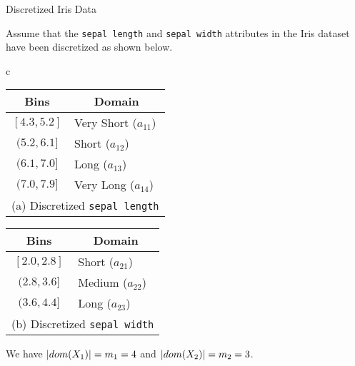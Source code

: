 \begin{frame}{Discretized Iris Data}

 Assume that the \texttt{sepal length} and \texttt{sepal
    width} attributes in the Iris dataset have been discretized
    as shown below.

    \medskip


  {\begin{tabular}{c}
{
{
    \label{tab:class:prob:slbin}
\renewcommand{\arraystretch}{1.1} 
\begin{tabular}{|c|l|}
\hline
Bins & \multicolumn{1}{c|}{Domain} \\ \hline
$[4.3, 5.2]$ & Very Short ($a_{11}$) \\
$(5.2, 6.1]$ & Short ($a_{12}$) \\
$(6.1, 7.0]$ & Long ($a_{13}$)\\
$(7.0, 7.9]$ & Very Long ($a_{14}$)\\ \hline
\multicolumn{2}{c}{\fontsize{8}{8}\selectfont(a) Discretized {\tt sepal length}}\\
\end{tabular}
}
{
\label{tab:class:prob:swbin}
\renewcommand{\arraystretch}{1.1}  
\begin{tabular}{|c|l|}
  \hline
  Bins & \multicolumn{1}{c|}{Domain} \\ \hline
  $[2.0, 2.8]$ & Short ($a_{21}$) \\
  $(2.8, 3.6]$ & Medium ($a_{22}$)\\
  $(3.6, 4.4]$ & Long ($a_{23}$)\\ \hline
  \multicolumn{2}{c}{\fontsize{8}{8}\selectfont(b) Discretized {\tt sepal width}}\\
\end{tabular}
    }}
\end{tabular}}

\medskip

    We have $|dom(X_1)|= m_1=4$ and $|dom(X_2)|=m_2=3$.

\end{frame}



